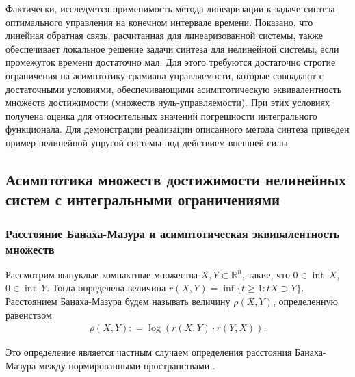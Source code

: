 \documentclass[../main.tex]{subfiles}
\begin{document}
Фактически, исследуется применимость метода линеаризации к задаче синтеза оптимального управления на конечном интервале времени. 
Показано, что линейная обратная связь, расчитанная для линеаризованной системы, также обеспечивает локальное решение задачи синтеза для нелинейной системы, если промежуток времени достаточно мал.   
Для этого требуются достаточно строгие ограничения на асимптотику грамиана управляемости, которые совпадают с достаточными условиями, обеспечивающими асимптотическую эквивалентность множеств достижимости (множеств нуль-управляемости). 
При этих условиях получена оценка для относительных значений погрешности интегрального функционала. 
Для демонстрации реализации описанного метода синтеза приведен пример нелинейной упругой системы под действием внешней силы. 


\subsection{Асимптотика множеств достижимости нелинейных систем с интегральными ограничениями} 


\subsubsection{Расстояние Банаха-Мазура и асимптотическая эквивалентность множеств}\label{sec21:AsymptoticEquality}

Рассмотрим выпуклые компактные множества $ X,Y \subset \mathbb R^n $, такие, что $0 \in \operatorname{int}\ X$, $0 \in \operatorname{int}\ Y$. 
Тогда определена величина $r(X, Y) = \inf \{t \geq 1: tX \supset Y \}$. 
Расстоянием Банаха-Мазура  будем называть величину $ \rho (X, Y)  $, определенную равенством 
\begin{gather*}
    \rho (X, Y): = \log (r(X,Y) \cdot r(Y, X)).
\end{gather*}

Это определение является частным случаем определения расстояния Банаха-Мазура между нормированными пространствами \cite[Определение 2.4.6]{Thompson}.
\end{document}
